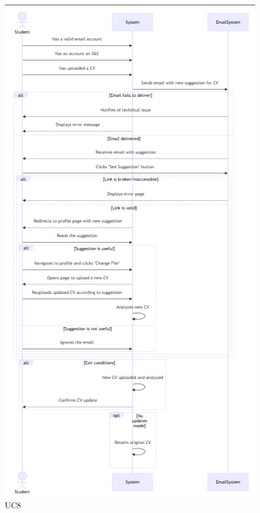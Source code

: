 \begin{figure}
    \centering
    \includegraphics[width=0.5\linewidth]{RASD//Images/UC8.png}
    \caption{UC8}
\end{figure}

